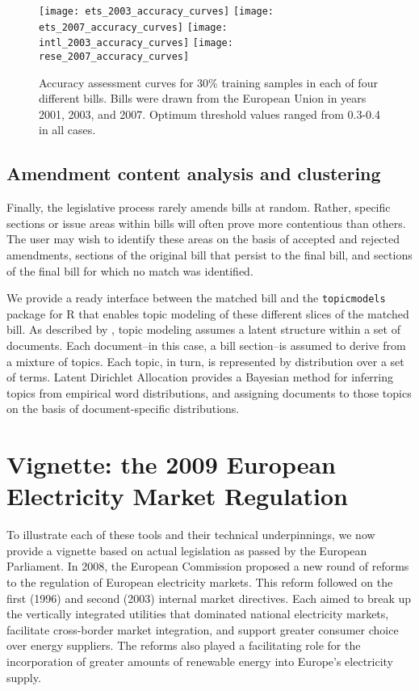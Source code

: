 \documentclass[11pt]{article}
\begin{document}
\begin{figure}[ht]
  \centering
  \texttt{[image: ets\_2003\_accuracy\_curves]}
  \texttt{[image: ets\_2007\_accuracy\_curves]}
  \texttt{[image: intl\_2003\_accuracy\_curves]}
  \texttt{[image: rese\_2007\_accuracy\_curves]}
  \caption{Accuracy assessment curves for 30\% training samples in
    each of four different bills. Bills were drawn from the European
    Union in years 2001, 2003, and 2007. Optimum threshold values
    ranged from 0.3-0.4 in all cases.}
  \label{fig:bill-accuracy-curves}
\end{figure}

\subsection{Amendment content analysis and clustering}
\label{sec:amendm-cont-analys}

Finally, the legislative process rarely amends bills at
random. Rather, specific sections or issue areas within bills will
often prove more contentious than others. The user may wish to
identify these areas on the basis of accepted and rejected amendments,
sections of the original bill that persist to the final bill, and
sections of the final bill for which no match was identified. 

We provide a ready interface between the matched bill and the
\texttt{topicmodels} package for R that enables topic modeling of
these different slices of the matched bill. As described by
\cite{blei2003latent}, topic modeling assumes a latent
structure within a set of documents. Each document--in this case, a
bill section--is assumed to derive from a mixture of topics. Each
topic, in turn, is represented by distribution over a
set of terms. Latent Dirichlet Allocation provides a Bayesian method
for inferring topics from empirical word distributions, and assigning
documents to those topics on the basis of document-specific
distributions. 



\section{Vignette: the 2009 European Electricity Market Regulation }
\label{sec:vign-2009-europ}

To illustrate each of these tools and their technical underpinnings,
we now provide a vignette based on actual legislation as passed by the
European Parliament. In 2008, the European Commission proposed a new round of reforms to
the regulation of European electricity markets. This reform followed
on the first (1996) and second (2003) internal market directives. Each
aimed to break up the vertically integrated utilities that dominated
national electricity markets, facilitate cross-border market
integration, and support greater consumer choice over energy
suppliers. The reforms also played a facilitating role for the
incorporation of greater amounts of renewable energy into Europe's
electricity supply. 
\end{document}
